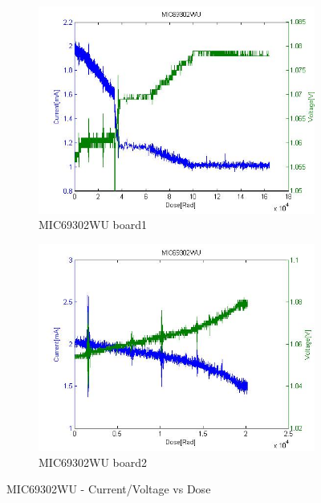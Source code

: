 \documentclass[12pt]{article}
\numberwithin{figure}{section}
\begin{document}
\begin{figure}[!htbp]
\centering
  \begin{subfigure}{.49\textwidth}
  \centering
  \includegraphics[width=\linewidth]{current_voltage_mic.jpg}
  \caption{MIC69302WU board1}
  \label{MIC69302WU_1}
  \end{subfigure}
  \begin{subfigure}{.49\textwidth}
  \centering
  \includegraphics[width=\linewidth]{current_volt_dose_MIC.jpg}
  \caption{MIC69302WU board2}
  \label{MIC69302WU_2}
  \end{subfigure}
 \caption{MIC69302WU - Current/Voltage vs Dose}
 \label{MIC69302WU_both}
\end{figure}
\end{document}
